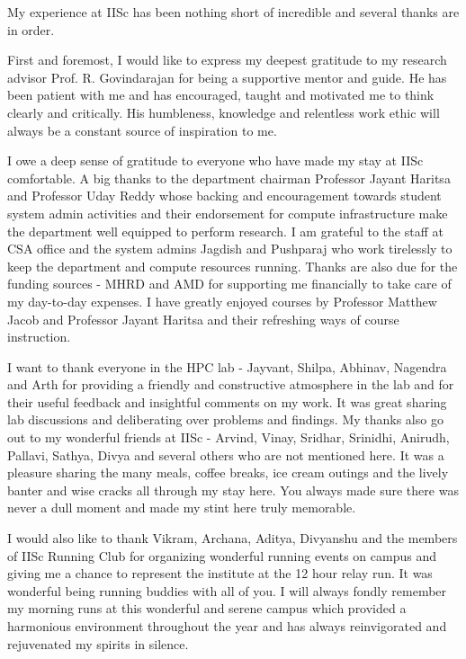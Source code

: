 My experience at IISc has been nothing short of incredible and several thanks are in order.
\par First and foremost, I would like to express my deepest gratitude to my research advisor Prof. R. Govindarajan for being a supportive mentor and guide. He has been patient with me and has encouraged, taught and motivated me to think clearly and critically. His humbleness, knowledge and relentless work ethic will always be a constant source of inspiration to me.
\par I owe a deep sense of gratitude to everyone who have made my stay at IISc comfortable. A big thanks to the department chairman Professor Jayant Haritsa and Professor Uday Reddy whose backing and encouragement towards student system admin activities and their endorsement for compute infrastructure make the department well equipped to perform research. I am grateful to the staff at CSA office and the system admins Jagdish and Pushparaj who work tirelessly to keep the department and compute resources running. Thanks are also due for the funding sources - MHRD and AMD for supporting me financially to take care of my day-to-day expenses. I have greatly enjoyed courses by Professor Matthew Jacob and Professor Jayant Haritsa and their refreshing ways of course instruction.
\par I want to thank everyone in the HPC lab - Jayvant, Shilpa, Abhinav, Nagendra and Arth for providing a friendly and constructive atmosphere in the lab and for their useful feedback and insightful comments on my work. It was great sharing lab discussions and deliberating over problems and findings. My thanks also go out to my wonderful friends at IISc - Arvind, Vinay, Sridhar, Srinidhi, Anirudh, Pallavi, Sathya, Divya and several others who are not mentioned here. It was a pleasure sharing the many meals, coffee breaks, ice cream outings and the lively banter and wise cracks all through my stay here. You always made sure there was never a dull moment and made my stint here truly memorable.
\par I would also like to thank Vikram, Archana, Aditya, Divyanshu and the members of IISc Running Club for organizing wonderful running events on campus and giving me a chance to represent the institute at the 12 hour relay run. It was wonderful being running buddies with all of you. I will always fondly remember my morning runs at this wonderful and serene campus which provided a harmonious environment throughout the year and has always reinvigorated and rejuvenated my spirits in silence.
